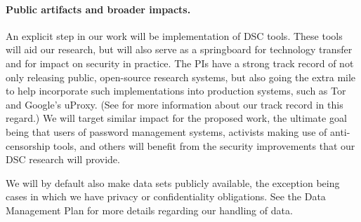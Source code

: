 {%

\paragraph{Public artifacts and broader impacts.} An explicit step in our work
will be implementation of DSC tools. These tools will aid our research, but will also
serve as a springboard for technology transfer and for impact on
security in practice. The PIs have a strong track record of not only releasing
public, open-source research systems, 
but also going the extra mile to help incorporate such implementations into production
systems, such as Tor and Google's uProxy. 
(See  for more information about our track record in this
regard.)
We will target similar impact for the
proposed work, the ultimate goal being that users of password management systems, 
activists making use of anti-censorship tools, and
others will benefit from the security improvements that our DSC research will provide. 
 

We will by default also make data sets publicly available, the exception being
cases in which we have privacy or confidentiality obligations. See the Data
Management Plan for more details regarding our handling of data.


}
